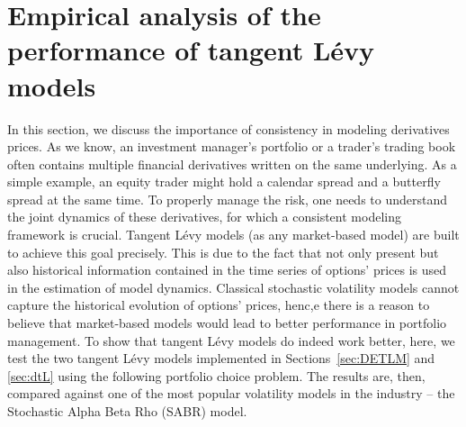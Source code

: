 \documentclass{article}
\numberwithin{equation}{section}
\begin{document}
\section{Empirical analysis of the performance of tangent L\'{e}vy models\label{sec:comparison}}

In this section, we discuss the importance of consistency in modeling derivatives prices. 
As we know, an investment manager's portfolio or a trader's trading book often contains multiple financial derivatives written on the same underlying. As a simple example, an equity trader might hold a calendar spread and a butterfly spread at the same time. To properly manage the risk, one needs to understand the joint dynamics of these derivatives, for which a consistent modeling framework is crucial.
Tangent L\'{e}vy models (as any market-based model) are built to achieve this goal precisely. This is due to the fact that not only present but also historical information contained in the time series of options' prices is used in the estimation of model dynamics. Classical stochastic volatility models cannot capture the historical evolution of options' prices, henc,e there is a reason to believe that market-based models would lead to better performance in portfolio management. 
To show that tangent L\'{e}vy models do indeed work better, here, we test the two tangent L\'{e}vy models implemented in Sections~\ref{sec:DETLM} and \ref{sec:dtL} using the following portfolio choice problem. The results are, then, compared against one of the most popular volatility models in the industry -- the Stochastic Alpha Beta Rho (SABR) model. 
\end{document}
